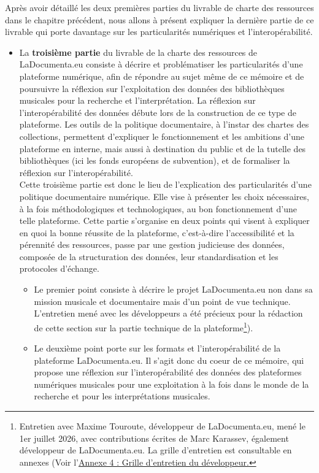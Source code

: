 Après avoir détaillé les deux premières parties du livrable de charte des ressources dans le chapitre précédent, nous allons à présent expliquer la dernière partie de ce livrable qui porte davantage sur les particularités numériques et l'interopérabilité. 
\begin{itemize}
	\item La \textbf{troisième partie} du livrable de la charte des ressources de LaDocumenta.eu consiste à décrire et problématiser les particularités d'une plateforme numérique, afin de répondre au sujet même de ce mémoire et de poursuivre la réflexion sur l'exploitation des données des bibliothèques musicales pour la recherche et l'interprétation. La réflexion sur l'interopérabilité des données débute lors de la construction de ce type de plateforme. Les outils de la politique documentaire, à l'instar des chartes des collections, permettent d'expliquer le fonctionnement et les ambitions d'une plateforme en interne, mais aussi à destination du public et de la tutelle des bibliothèques (ici les fonds européens de subvention), et de formaliser la réflexion sur l'interopérabilité. \\ 
	Cette troisième partie est donc le lieu de l'explication des particularités d'une politique documentaire numérique. Elle vise à présenter les choix nécessaires, à la fois méthodologiques et technologiques, au bon fonctionnement d'une telle plateforme. Cette partie s'organise en deux points qui visent à expliquer en quoi la bonne réussite de la plateforme, c'est-à-dire l'accessibilité et la pérennité des ressources, passe par une gestion judicieuse des données, composée de la structuration des données, leur standardisation et les protocoles d'échange. 
	
	\begin{itemize}
		\item Le premier point consiste à décrire le projet LaDocumenta.eu non dans sa mission musicale et documentaire mais d'un point de vue technique. L'entretien mené avec les développeurs a été précieux pour la rédaction de cette section sur la partie technique de la plateforme\footnote[18]{Entretien avec Maxime Touroute, développeur de LaDocumenta.eu, mené le 1er juillet 2026, avec contributions écrites de Marc Karassev, également développeur de LaDocumenta.eu. La grille d'entretien est consultable en annexes (Voir l'\hyperlink{annexe:annexe4entretiendeveloppeur.pdf}{Annexe 4 : Grille d'entretien du développeur.}}).
		
		\item Le deuxième point porte sur les formats et l'interopérabilité de la plateforme LaDocumenta.eu. Il s'agit donc du coeur de ce mémoire, qui propose une réflexion sur l'interopérabilité des données des plateformes numériques musicales pour une exploitation à la fois dans le monde de la recherche et pour les interprétations musicales.
		

\end{itemize}
\end{itemize}
